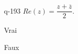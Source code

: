 \begin{truefalse}{q-193}
$Re(z)= \dfrac{z+\overline z}{2}$.
\item* Vrai
\item Faux
\end{truefalse}

